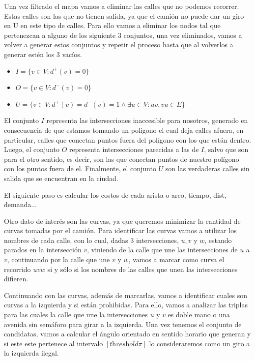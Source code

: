 \vspace{3mm} 

Una vez filtrado el mapa vamos a eliminar las calles que no podemos recorrer. Estas calles son las que no tienen salida, ya que el camión no puede dar un giro en U en este tipo de calles. Para ello vamos a eliminar los nodos tal que pertenezcan a alguno de los siguiente 3 conjuntos, una vez eliminados, vamos a volver a generar estos conjuntos y repetir el proceso hasta que al volverlos a generar estén los 3 vacíos.

\begin{itemize}
    \item $I = \{v\in V: d^+(v) = 0\}$
    \item $O = \{v\in V: d^-(v) = 0\}$
    \item $U = \{v\in V: d^+(v) = d^-(v) = 1 \land \exists u\in V : uv,vu \in E\}$
\end{itemize}

El conjunto $I$ representa las intersecciones inaccesible para nosotros, generado en consecuencia de que estamos tomando un polígono el cual deja calles afuera, en particular, calles que conectan puntos fuera del polígono con los que están dentro. Luego, el conjunto $O$ representa intersecciones parecidas a las de $I$, salvo que son para el otro sentido, es decir, son las que conectan puntos de nuestro polígono con los puntos fuera de el. Finalmente, el conjunto $U$ son las verdaderas calles sin salida que se encuentran en la ciudad.

\vspace{3mm} 

El siguiente paso es calcular los costos de cada arista o arco, tiempo, dist, demanda...

\vspace{3mm} 

Otro dato de interés son las curvas, ya que queremos minimizar la cantidad de curvas tomadas por el camión. Para identificar las curvas vamos a utilizar los nombres de cada calle, con lo cual, dadas 3 intersecciones, $u,v$ y $w$, estando parados en la intersección $v$, viniendo de la calle que une las intersecciones de $u$ a $v$, continuando por la calle que une $v$ y $w$, vamos a marcar como curva el recorrido $uvw$ si y sólo si los nombres de las calles que unen las intersecciones difieren.
\vspace{3mm} 

Continuando con las curvas, además de marcarlas, vamos a identificar cuales son curvas a la izquierda y si están prohibidas. Para ello, vamos a analizar las triplas para las cuales la calle que une la intersecciones $u$ y $v$ es doble mano o una avenida sin semáforo para girar a la izquierda. Una vez tenemos el conjunto de candidatas, vamos a calcular el ángulo orientado en sentido horario que generan y si este este pertenece al intervalo $[\textit{threshold} \pi]$ lo consideraremos como un giro a la izquierda ilegal.

